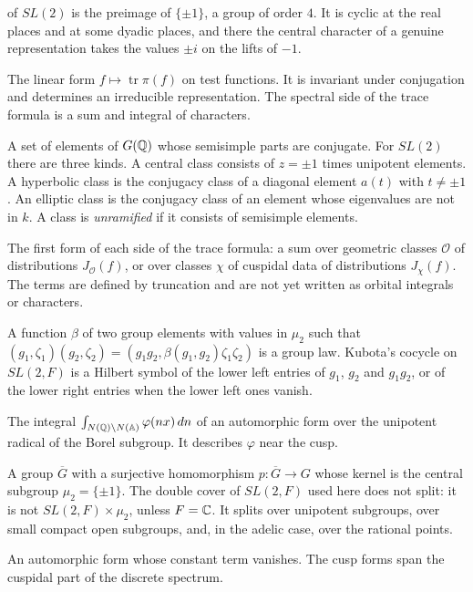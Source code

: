 \begin{description}
  of $SL(2)$ is the preimage of $\{\pm1\}$, a group of order $4$. It is
  cyclic at the real places and at some dyadic places, and there the
  central character of a genuine representation takes the values $\pm i$
  on the lifts of $-1$.
\item[Character of a representation.] The linear form $f\mapsto
  \operatorname{tr}\pi(f)$ on test functions. It is invariant under
  conjugation and determines an irreducible representation. The spectral
  side of the trace formula is a sum and integral of characters.
\item[Class (geometric).] A set of elements of $G(\mathbb{Q})$ whose semisimple
  parts are conjugate. For $SL(2)$ there are three kinds. A central class
  consists of $z=\pm1$ times unipotent elements. A hyperbolic class is
  the conjugacy class of a diagonal element $a(t)$ with $t\ne\pm1$. An
  elliptic class is the conjugacy class of an element whose eigenvalues
  are not in $k$. A class is \emph{unramified} if it consists of
  semisimple elements.
\item[Coarse expansion.] The first form of each side of the trace
  formula: a sum over geometric classes $\mathcal O$ of distributions
  $J_{\mathcal O}(f)$, or over classes $\chi$ of cuspidal data of
  distributions $J_\chi(f)$. The terms are defined by truncation and are
  not yet written as orbital integrals or characters.
\item[Cocycle.] A function $\beta$ of two group elements with values in
  $\mu_2$ such that $(g_1,\zeta_1)(g_2,\zeta_2)=(g_1g_2,\beta(g_1,g_2)
  \zeta_1\zeta_2)$ is a group law. Kubota's cocycle on $SL(2,F)$ is a
  Hilbert symbol of the lower left entries of $g_1$, $g_2$ and $g_1g_2$,
  or of the lower right entries when the lower left ones vanish.
\item[Constant term.] The integral $\int_{N(\mathbb{Q})\backslash N(\mathbb{A})}
  \varphi(nx)\,dn$ of an automorphic form over the unipotent radical of
  the Borel subgroup. It describes $\varphi$ near the cusp.
\item[Cover, double cover.] A group $\overline G$ with a surjective
  homomorphism $p\colon\overline G\to G$ whose kernel is the central
  subgroup $\mu_2=\{\pm1\}$. The double cover of $SL(2,F)$ used here does
  not split: it is not $SL(2,F)\times\mu_2$, unless $F=\mathbb{C}$. It splits over
  unipotent subgroups, over small compact open subgroups, and, in the
  adelic case, over the rational points.
\item[Cusp form.] An automorphic form whose constant term vanishes. The
  cusp forms span the cuspidal part of the discrete spectrum.

\end{description}
